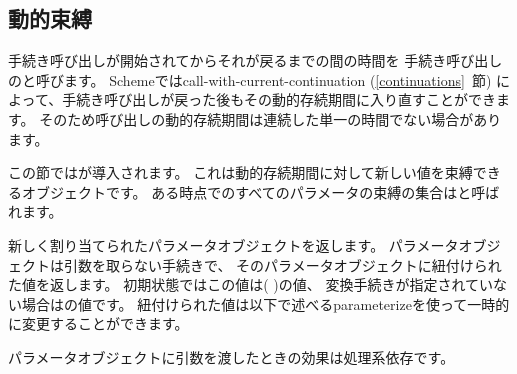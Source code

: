 \subsection{動的束縛}\unsection

手続き呼び出しが開始されてからそれが戻るまでの間の時間を
手続き呼び出しのと呼びます。
Schemeでは{\cf call-with-current-continuation} (\ref{continuations}~節)
によって、手続き呼び出しが戻った後もその動的存続期間に入り直すことができます。
そのため呼び出しの動的存続期間は連続した単一の時間でない場合があります。

この節ではが導入されます。
これは動的存続期間に対して新しい値を束縛できるオブジェクトです。
ある時点でのすべてのパラメータの束縛の集合はと呼ばれます。

\begin{entry}{%
}

新しく割り当てられたパラメータオブジェクトを返します。
パラメータオブジェクトは引数を取らない手続きで、
そのパラメータオブジェクトに紐付けられた値を返します。
初期状態ではこの値は{\cf ( )}の値、
変換手続きが指定されていない場合はの値です。
紐付けられた値は以下で述べる{\cf parameterize}を使って一時的に変更することができます。

パラメータオブジェクトに引数を渡したときの効果は処理系依存です。
\end{entry}

